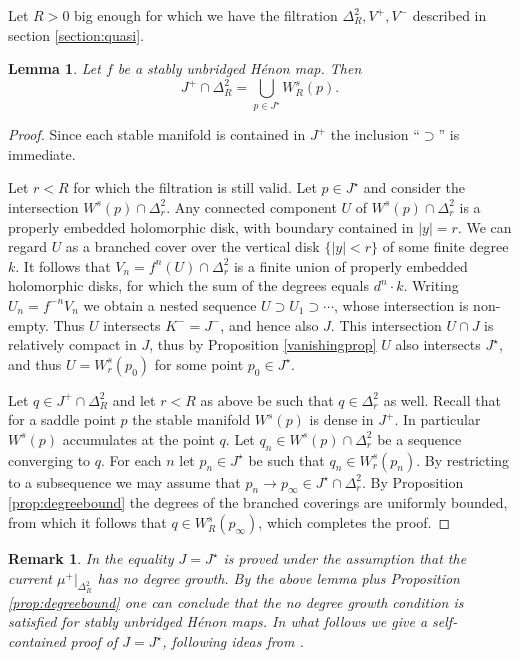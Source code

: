 \documentclass[10pt,a4paper]{article}
\newtheorem{lemma}[theorem]{Lemma}
\newtheorem{remark}[theorem]{Remark}
\begin{document}
Let $R>0$ big enough for which we have the filtration $\Delta_R^2,V^+, V^-$ described in section \ref{section:quasi}.
\begin{lemma}
\label{lemma:5.5}
Let $f$ be a stably unbridged H\'enon map. Then
$$
J^+ \cap \Delta^2_R = \bigcup_{p \in J^\star} W^s_R(p).
$$
\end{lemma}
\begin{proof}
Since each stable manifold is contained in $J^+$ the inclusion ``$\supset$'' is immediate.

Let $r<R$ for which the filtration is still valid.
Let $p \in J^\star$ and consider the intersection $W^s(p) \cap \Delta^2_r$.  Any connected component $U$ of $W^s(p) \cap \Delta^2_r$ is a properly embedded holomorphic disk, with boundary contained in $|y| = r$. We can regard $U$ as a branched cover over the vertical disk $\{|y| < r\}$ of some finite degree $k$. It follows that $V_n = f^n(U) \cap \Delta^2_r$ is a finite union of properly embedded holomorphic disks, for which the sum of the degrees equals $d^n \cdot k$. Writing $U_n = f^{-n} V_n$ we obtain a nested sequence $U \supset U_1 \supset \cdots$, whose intersection is non-empty. Thus $U$ intersects $K^- = J^-$, and hence also $J$. This intersection $U \cap J$ is relatively compact in $J$, thus by Proposition \ref{vanishingprop} $U$ also intersects $J^\star$, and thus $U = W^s_r(p_0)$ for some point $p_0 \in J^\star$.

Let $q \in J^+ \cap \Delta^2_{R}$ and let $r<R$ as above be such that $q\in \Delta^2_r$ as well. Recall that for a saddle point $p$ the stable manifold $W^s(p)$ is dense in $J^+$. In particular $W^s(p)$ accumulates at the point $q$. Let $q_n \in W^s(p)\cap \Delta^2_{r}$ be a sequence converging to $q$. For each $n$ let $p_n\in J^\star$ be such that $q_n \in W^s_{r}(p_n)$. By restricting to a subsequence we may assume that $p_n \rightarrow p_\infty \in J^\star \cap \Delta^2_r$. By Proposition \ref{prop:degreebound} the degrees of the branched coverings are uniformly bounded, from which it follows that $q \in W^s_R(p_\infty)$, which completes the proof.
\end{proof}


\begin{remark}\label{dujardin}
In \cite{D} the equality $J = J^\star$ is proved under the assumption that the current $\mu^+|_{\Delta^2_R}$ has \emph{no degree growth}. By the above lemma plus Proposition \ref{prop:degreebound} one can conclude that the no degree growth condition is satisfied for stably unbridged H\'enon maps. In what follows we give a self-contained proof of $J = J^\star$, following ideas from \cite{F}.
\end{remark}
\end{document}
